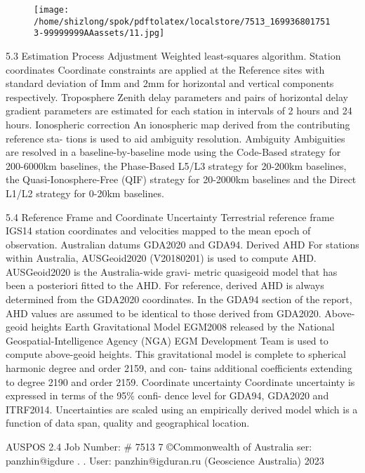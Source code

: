 \documentclass[a4paper,12pt]{article}
\begin{document}
\begin{figure}[h]

\texttt{[image: /home/shizlong/spok/pdftolatex/localstore/7513\_1699368017513-99999999AAassets/11.jpg]}

\centering

\end{figure}

    5.3 Estimation Process         Adjustment    Weighted least-squares algorithm.         Station coordinates    Coordinate constraints are applied at the Reference sites with  standard deviation of Imm and 2mm for horizontal and vertical  components respectively.         Troposphere    Zenith delay parameters and pairs of horizontal delay gradient  parameters are estimated for each station in intervals of 2 hours  and 24 hours.         Ionospheric correction    An ionospheric map derived from the contributing reference sta-  tions is used to aid ambiguity resolution.         Ambiguity              Ambiguities are resolved in a baseline-by-baseline mode using the  Code-Based strategy for 200-6000km baselines, the Phase-Based  L5/L3 strategy for 20-200km baselines, the Quasi-Ionosphere-Free  (QIF) strategy for 20-2000km baselines and the Direct L1/L2  strategy for 0-20km baselines.          

\vspace{10pt}

    5.4 Reference Frame and Coordinate Uncertainty         Terrestrial reference  frame    IGS14 station coordinates and velocities mapped to the mean  epoch of observation.         Australian datums    GDA2020 and GDA94.         Derived AHD    For stations within Australia, AUSGeoid2020 (V20180201) is used  to compute AHD. AUSGeoid2020 is the Australia-wide gravi-  metric quasigeoid model that has been a posteriori fitted to the  AHD. For reference, derived AHD is always determined from the  GDA2020 coordinates. In the GDA94 section of the report, AHD  values are assumed to be identical to those derived from GDA2020.         Above-geoid heights    Earth Gravitational Model EGM2008 released by the National  Geospatial-Intelligence Agency (NGA) EGM Development Team  is used to compute above-geoid heights. This gravitational model  is complete to spherical harmonic degree and order 2159, and con-  tains additional coefficients extending to degree 2190 and order  2159.         Coordinate uncertainty              Coordinate uncertainty is expressed in terms of the 95\% confi-  dence level for GDA94, GDA2020 and ITRF2014. Uncertainties  are scaled using an empirically derived model which is a function  of data span, quality and geographical location.          

\vspace{10pt}

         AUSPOS 2.4 Job Number: \# 7513 7 ©Commonwealth of Australia    ser: panzhin@igdure . .  User: panzhin@igduran.ru (Geoscience Australia) 2023 

\vspace{10pt}

\par

\vspace{10pt}
\end{document}
